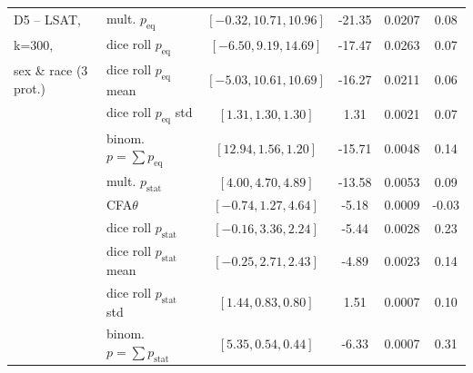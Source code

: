 \begin{table}[t!]
{\begin{tabular}{llcccc}
		\midrule
		\midrule
		D5 -- LSAT, 			& mult. \algoFAIR $p_{\text{eq}}$ 	& $[-0.32, 10.71, 10.96]$ 	& -21.35 	& 0.0207 	& 0.08 \\
		k=300, 					& dice roll $p_{\text{eq}}$		& $[-6.50, 9.19, 14.69]$	& -17.47	& 0.0263 	& 0.07\\
		sex \& race (3 prot.)	& dice roll $p_{\text{eq}}$ mean	& $[-5.03, 10.61, 10.69]$		& -16.27		& 0.0211 	& 0.06 \\
								& dice roll $p_{\text{eq}}$	std & $[1.31, 1.30, 1.30]$		& 1.31		& 0.0021 	& 0.07 \\
								& binom. \algoFAIR $p = \sum p_{\text{eq}}$	& $[12.94,1.56, 1.20]$		& -15.71		& 0.0048 	& 0.14 \\
								\cline{2-6}
			& mult. \algoFAIR $p_{\text{stat}}$ 	& $[4.00, 4.70, 4.89]$ 		& -13.58 	& 0.0053	& 0.09 \\
							 	& CFA$\theta$ 					& $[-0.74, 1.27, 4.64]$ 	& -5.18		& 0.0009 	& -0.03 \\
								& dice roll $p_{\text{stat}}$	& $[-0.16, 3.36, 2.24]$		& -5.44		& 0.0028 	& 0.23 \\
								& dice roll $p_{\text{stat}}$ mean	& $[-0.25, 2.71, 2.43]$		& -4.89		& 0.0023 	& 0.14 \\
								& dice roll $p_{\text{stat}}$	std & $[1.44, 0.83, 0.80]$		& 1.51		& 0.0007 	& 0.10 \\
								& binom. \algoFAIR $p = \sum p_{\text{stat}}$	& $[5.35,0.54, 0.44]$		& -6.33		& 0.0007 	& 0.31 \\													
		\bottomrule
	\end{tabular}
	}
\end{table}
%
